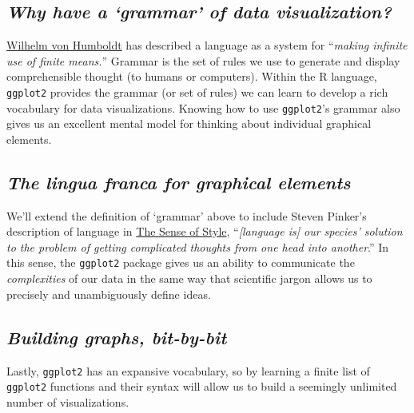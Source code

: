 \documentclass[letterpaper,12pt,twoside,]{pinp}
\begin{document}
\hypertarget{why-have-a-grammar-of-data-visualization}{%
\subsection{\texorpdfstring{\textbf{\emph{Why have a `grammar' of data
visualization?}}}{Why have a `grammar' of data visualization?}}\label{why-have-a-grammar-of-data-visualization}}

\href{https://en.wikipedia.org/wiki/Wilhelm_von_Humboldt}{Wilhelm von
Humboldt} has described a language as a system for ``\emph{making
infinite use of finite means.}'' Grammar is the set of rules we use to
generate and display comprehensible thought (to humans or computers).
Within the R language, \texttt{ggplot2} provides the grammar (or set of
rules) we can learn to develop a rich vocabulary for data
visualizations. Knowing how to use \texttt{ggplot2}'s grammar also gives
us an excellent mental model for thinking about individual graphical
elements.

\hypertarget{the-lingua-franca-for-graphical-elements}{%
\subsection{\texorpdfstring{\textbf{\emph{The lingua franca for
graphical
elements}}}{The lingua franca for graphical elements}}\label{the-lingua-franca-for-graphical-elements}}

We'll extend the definition of `grammar' above to include Steven
Pinker's description of language in
\href{https://www.amazon.com/Sense-Style-Thinking-Persons-Writing/dp/0143127799}{The
Sense of Style}, ``\emph{{[}language is{]} our species' solution to the
problem of getting complicated thoughts from one head into another}.''
In this sense, the \texttt{ggplot2} package gives us an ability to
communicate the \emph{complexities} of our data in the same way that
scientific jargon allows us to precisely and unambiguously define ideas.

\hypertarget{building-graphs-bit-by-bit}{%
\subsection{\texorpdfstring{\textbf{\emph{Building graphs,
bit-by-bit}}}{Building graphs, bit-by-bit}}\label{building-graphs-bit-by-bit}}

Lastly, \texttt{ggplot2} has an expansive vocabulary, so by learning a
finite list of \texttt{ggplot2} functions and their syntax will allow us
to build a seemingly unlimited number of visualizations.
\end{document}
